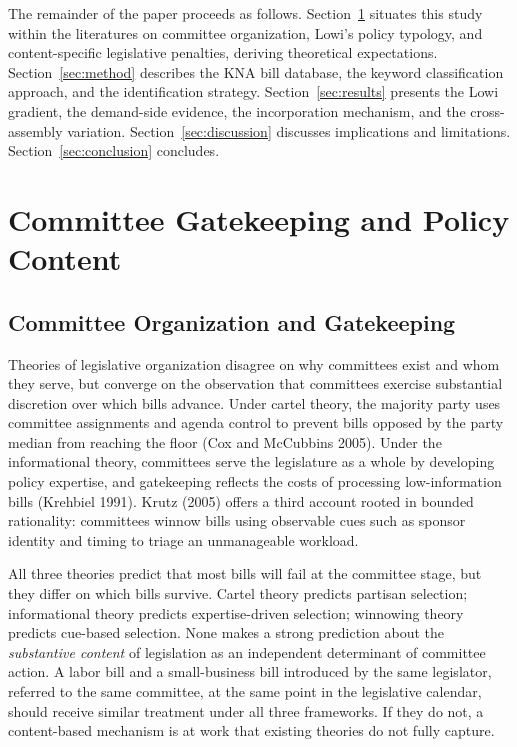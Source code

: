\documentclass[11pt]{article}
\begin{document}
The remainder of the paper proceeds as follows. Section~\ref{sec:lit} situates this study within the literatures on committee organization, Lowi's policy typology, and content-specific legislative penalties, deriving theoretical expectations. Section~\ref{sec:method} describes the KNA bill database, the keyword classification approach, and the identification strategy. Section~\ref{sec:results} presents the Lowi gradient, the demand-side evidence, the incorporation mechanism, and the cross-assembly variation. Section~\ref{sec:discussion} discusses implications and limitations. Section~\ref{sec:conclusion} concludes.


\section{Committee Gatekeeping and Policy Content}
\label{sec:lit}

\subsection{Committee Organization and Gatekeeping}

Theories of legislative organization disagree on why committees exist and whom they serve, but converge on the observation that committees exercise substantial discretion over which bills advance. Under cartel theory, the majority party uses committee assignments and agenda control to prevent bills opposed by the party median from reaching the floor (Cox and McCubbins 2005). Under the informational theory, committees serve the legislature as a whole by developing policy expertise, and gatekeeping reflects the costs of processing low-information bills (Krehbiel 1991). Krutz (2005) offers a third account rooted in bounded rationality: committees winnow bills using observable cues such as sponsor identity and timing to triage an unmanageable workload.

All three theories predict that most bills will fail at the committee stage, but they differ on which bills survive. Cartel theory predicts partisan selection; informational theory predicts expertise-driven selection; winnowing theory predicts cue-based selection. None makes a strong prediction about the \emph{substantive content} of legislation as an independent determinant of committee action. A labor bill and a small-business bill introduced by the same legislator, referred to the same committee, at the same point in the legislative calendar, should receive similar treatment under all three frameworks. If they do not, a content-based mechanism is at work that existing theories do not fully capture.
\end{document}
